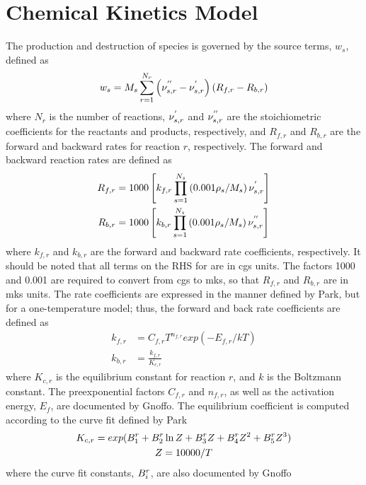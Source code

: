 \section{Chemical Kinetics Model}

The production and destruction of species is governed by the source terms,
$w_s$, defined as
\begin{equation}
  w_s = M_s \sum_{r=1}^{N_r}\left( \nu_{s,r}^{''} - \nu_{s,r}^{'} \right)
        \left( R_{f,r} - R_{b,r} \right)
  \label{source-term}
\end{equation}
where $N_r$ is the number of reactions, $\nu_{s,r}^{'}$ and $\nu_{s,r}^{''}$ are the
stoichiometric coefficients for the reactants and products, respectively, and
$R_{f,r}$ and $R_{b,r}$ are the forward and backward rates for reaction
$r$, respectively.  The forward and backward reaction rates are defined as
\begin{align}
  R_{f,r} &= 1000\left[ k_{f,r}\prod_{s=1}^{N_s}\left( 0.001\rho_s/M_s
  \right)\nu_{s,r}^{'} \right] \label{forward-rate} \\
  R_{b,r} &= 1000\left[ k_{b,r}\prod_{s=1}^{N_s}\left( 0.001\rho_s/M_s
  \right)\nu_{s,r}^{''} \right]
  \label{backward-rate}
\end{align}
where $k_{f,r}$ and $k_{b,r}$ are the forward and backward rate coefficients,
respectively.  It should be noted that all terms on the RHS for
 are in cgs units.  The factors 1000 and
0.001 are required to convert from cgs to mks, so that $R_{f,r}$ and $R_{b,r}$
are in mks units.  The rate coefficients are expressed in the manner defined by
Park\cite{park}, but for a one-temperature model; thus, the forward and back
rate coefficients are defined as
\begin{align}
  k_{f,r} &= C_{f,r}T^{n_{f,r}}exp\left( -E_{f,r}/kT \right)
  \label{forward-rate-coef} \\
  k_{b,r} &= \frac{k_{f,r}}{K_{c,r}}
  \label{backward-rate-coef}
\end{align}
where $K_{c,r}$ is the equilibrium constant for reaction $r$, and $k$ is the
Boltzmann constant.  The preexponential factors $C_{f,r}$ and $n_{f,r}$, as well
as the activation energy, $E_f$, are documented by Gnoffo\cite{gnoffo-tp}.
The equilibrium coefficient is computed according to the curve fit defined by
Park\cite{park1985convergence}
\begin{gather}
  K_{c,r} = exp(B_{1}^{r} + B_{2}^{r}\ln{Z} + B_{3}^{r}Z + B_{4}^{r}Z^2 + B_{5}^{r}Z^3) \\
  Z = 10000/T
\end{gather}
where the curve fit constants, $B_{i}^{r}$, are also documented by
Gnoffo\cite{gnoffo-tp}
